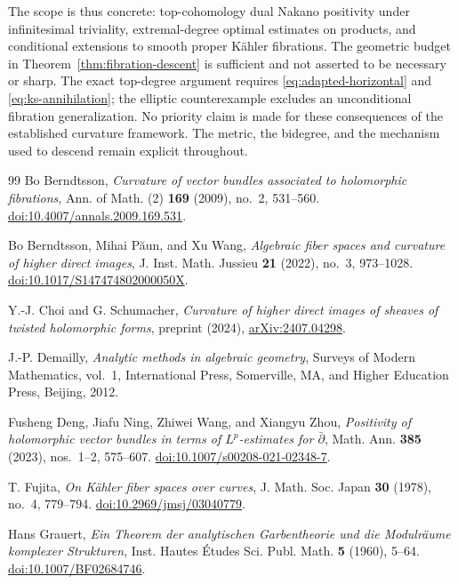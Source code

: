 \documentclass[11pt,reqno]{amsart}
\numberwithin{equation}{section}
\theoremstyle{definition}
\theoremstyle{remark}
\begin{document}
The scope is thus concrete: top-cohomology dual Nakano positivity under infinitesimal triviality, extremal-degree optimal estimates on products, and conditional extensions to smooth proper K\"ahler fibrations. The geometric budget in Theorem~\ref{thm:fibration-descent} is sufficient and not asserted to be necessary or sharp. The exact top-degree argument requires \eqref{eq:adapted-horizontal} and \eqref{eq:ks-annihilation}; the elliptic counterexample excludes an unconditional fibration generalization. No priority claim is made for these consequences of the established curvature framework. The metric, the bidegree, and the mechanism used to descend remain explicit throughout.

\clearpage
\begin{thebibliography}{99}
Bo Berndtsson, \emph{Curvature of vector bundles associated to holomorphic fibrations}, Ann. of Math. (2) \textbf{169} (2009), no.~2, 531--560. \href{https://doi.org/10.4007/annals.2009.169.531}{doi:10.4007/annals.2009.169.531}.

Bo Berndtsson, Mihai P\u{a}un, and Xu Wang, \emph{Algebraic fiber spaces and curvature of higher direct images}, J. Inst. Math. Jussieu \textbf{21} (2022), no.~3, 973--1028. \href{https://doi.org/10.1017/S147474802000050X}{doi:10.1017/S147474802000050X}.

Y.-J. Choi and G. Schumacher, \emph{Curvature of higher direct images of sheaves of twisted holomorphic forms}, preprint (2024), \href{https://arxiv.org/abs/2407.04298}{arXiv:2407.04298}.

J.-P. Demailly, \emph{Analytic methods in algebraic geometry}, Surveys of Modern Mathematics, vol.~1, International Press, Somerville, MA, and Higher Education Press, Beijing, 2012.

Fusheng Deng, Jiafu Ning, Zhiwei Wang, and Xiangyu Zhou, \emph{Positivity of holomorphic vector bundles in terms of $L^p$-estimates for $\bar\partial$}, Math. Ann. \textbf{385} (2023), nos.~1--2, 575--607. \href{https://doi.org/10.1007/s00208-021-02348-7}{doi:10.1007/s00208-021-02348-7}.

T. Fujita, \emph{On K\"ahler fiber spaces over curves}, J. Math. Soc. Japan \textbf{30} (1978), no.~4, 779--794. \href{https://doi.org/10.2969/jmsj/03040779}{doi:10.2969/jmsj/03040779}.

Hans Grauert, \emph{Ein Theorem der analytischen Garbentheorie und die Modulr\"aume komplexer Strukturen}, Inst. Hautes \'{E}tudes Sci. Publ. Math. \textbf{5} (1960), 5--64. \href{https://doi.org/10.1007/BF02684746}{doi:10.1007/BF02684746}.


\end{thebibliography}
\end{document}
